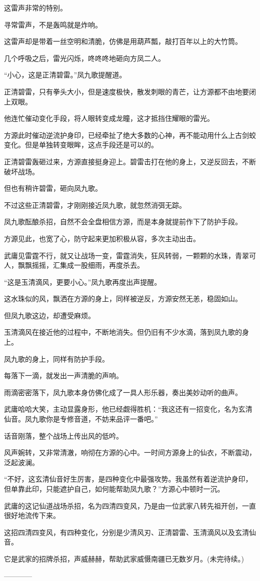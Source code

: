 \begin{this_body}
这雷声非常的特别。

寻常雷声，不是轰鸣就是炸响。

这雷声却是带着一丝空明和清脆，仿佛是用葫芦瓢，敲打百年以上的大竹筒。

几个呼吸之后，雷光闪烁，咚咚咚地砸向方凤二人。

“小心，这是正清碧雷。”凤九歌提醒道。

正清碧雷，只有拳头大小，但是速度极快，散发刺眼的青芒，让方源都不由地要闭上双眼。

他连忙催动变化手段，将人眼转变成龙瞳，这才抵挡住耀眼的雷光。

方源此时催动逆流护身印，已经牵扯了绝大多数的心神，再不能动用什么上古剑蛟变化。但是单独转变眼眸，这点手段还是可以的。

正清碧雷轰砸过来，方源直接挺身迎上。碧雷击打在他的身上，又逆反回去，不断破坏战场。

但也有稍许碧雷，砸向凤九歌。

不过这些正清碧雷，才刚刚接近凤九歌，就忽然消弭无踪。

凤九歌酝酿杀招，自然不会全盘相信方源，而是本身就提前作下了防护手段。

方源见此，也宽了心，防守起来更加积极从容，多次主动出击。

武庸见雷霆不行，就又让战场一变，雷霆消失，狂风转弱，一颗颗的水珠，青翠可人，飘飘摇摇，汇集成一股细雨，再度杀去。

“这是玉清滴风，更要小心。”凤九歌再度出声提醒。

这水珠似的风，飘洒在方源的身上，同样被逆反，方源安然无恙，稳固如山。

但凤九歌这边，却遭受麻烦。

玉清滴风在接近他的过程中，不断地消失。但仍旧有不少水滴，落到凤九歌的身上。

凤九歌的身上，同样有防护手段。

每落下一滴，就发出一声清脆的声响。

雨滴密密落下，凤九歌本身仿佛化成了一具人形乐器，奏出美妙动听的曲声。

武庸哈哈大笑，主动显露身形，他已经觑得胜机：“我这还有一招变化，名为玄清仙音。凤九歌你是专修音道，不妨来品评一番吧。”

话音刚落，整个战场上传出风的低吟。

风声婉转，又非常清澈，响彻在方源的心中。一时间方源身上的仙衣，不断震动，泛起波澜。

“不好，这玄清仙音好生厉害，是四种变化中最强攻势。我虽然有着逆流护身印，但单靠此印，只能遮护自己，如何能帮助凤九歌？”方源心中顿时一沉。

武庸的这记仙道战场杀招，名为四清四变风，乃是由一位武家八转先祖开创，一直很好地流传下来。

这招四清四变风，有四种变化，分别是少清风刃、正清碧雷、玉清滴风以及玄清仙音。

它是武家的招牌杀招，声威赫赫，帮助武家威慑南疆已无数岁月。(未完待续。)

------------

\end{this_body}

